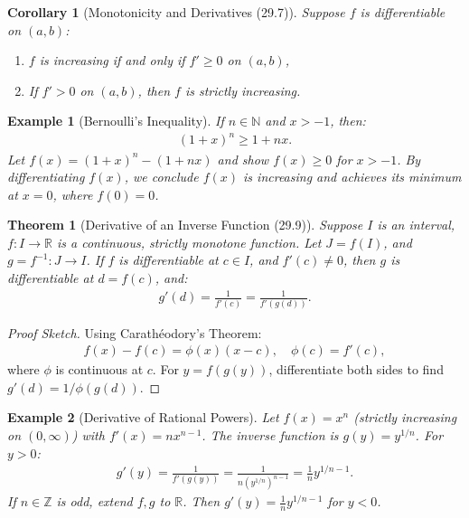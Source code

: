 \documentclass[7pt]{article}
\theoremstyle{definition}
\theoremstyle{plain}
\newtheorem{theorem}{Theorem}
\newtheorem{example}{Example}
\newtheorem{corollary}{Corollary}
\begin{document}
\begin{corollary}[Monotonicity and Derivatives (29.7)]
Suppose $ f $ is differentiable on $ (a, b) $:
\begin{enumerate}
    \item $ f $ is increasing if and only if $ f' \geq 0 $ on $ (a, b) $,
    \item If $ f' > 0 $ on $ (a, b) $, then $ f $ is strictly increasing.
\end{enumerate}
\end{corollary}

\begin{example}[Bernoulli’s Inequality]
If $ n \in \mathbb{N} $ and $ x > -1 $, then:
\begin{align}
(1 + x)^n \geq 1 + nx.
\end{align}
Let $ f(x) = (1 + x)^n - (1 + nx) $ and show $ f(x) \geq 0 $ for $ x > -1 $. By differentiating $ f(x) $, we conclude $ f(x) $ is increasing and achieves its minimum at $ x = 0 $, where $ f(0) = 0 $.
\end{example}

\begin{theorem}[Derivative of an Inverse Function (29.9)]
Suppose $ I $ is an interval, $ f : I \to \mathbb{R} $ is a continuous, strictly monotone function. Let $ J = f(I) $, and $ g = f^{-1} : J \to I $. If $ f $ is differentiable at $ c \in I $, and $ f'(c) \neq 0 $, then $ g $ is differentiable at $ d = f(c) $, and:
\begin{align}
g'(d) = \frac{1}{f'(c)} = \frac{1}{f'(g(d))}.
\end{align}
\end{theorem}

\begin{proof}[Proof Sketch]
Using Carathéodory’s Theorem:
\begin{align}
f(x) - f(c) = \phi(x)(x - c), \quad \phi(c) = f'(c),
\end{align}
where $ \phi $ is continuous at $ c $. For $ y = f(g(y)) $, differentiate both sides to find $ g'(d) = 1 / \phi(g(d)) $.
\end{proof}

\begin{example}[Derivative of Rational Powers]
Let $ f(x) = x^n $ (strictly increasing on $ (0, \infty) $) with $ f'(x) = nx^{n-1} $. The inverse function is $ g(y) = y^{1/n} $. For $ y > 0 $:
\begin{align}
g'(y) = \frac{1}{f'(g(y))} = \frac{1}{n(y^{1/n})^{n-1}} = \frac{1}{n} y^{1/n - 1}.
\end{align}
If $ n \in \mathbb{Z} $ is odd, extend $ f, g $ to $ \mathbb{R} $. Then $ g'(y) = \frac{1}{n} y^{1/n - 1} $ for $ y < 0 $.
\end{example}
\end{document}
